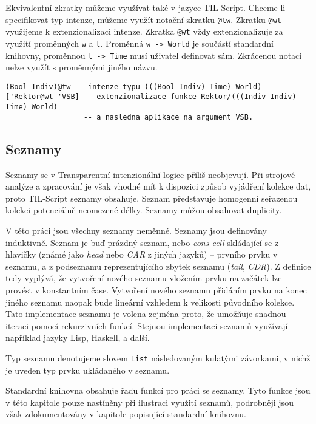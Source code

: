 Ekvivalentní zkratky můžeme využívat také v jazyce TIL-Script. Chceme-li specifikovat typ intenze,
můžeme využít notační zkratku \lstinline{@tw}. Zkratku \lstinline{@wt} využijeme k extenzionalizaci
intenze. Zkratka \lstinline{@wt} vždy extenzionalizuje za využití proměnných \lstinline{w} a
\lstinline{t}. Proměnná \lstinline{w -> World} je součástí standardní knihovny, proměnnou
\lstinline{t -> Time} musí uživatel definovat sám. Zkrácenou notaci nelze využít s proměnnými
jiného názvu.

\begin{lstlisting}[caption={Příklad využití zkrácené notace}]
(Bool Indiv)@tw -- intenze typu (((Bool Indiv) Time) World)
['Rektor@wt 'VSB] -- extenzionalizace funkce Rektor/(((Indiv Indiv) Time) World)
                  -- a nasledna aplikace na argument VSB.
\end{lstlisting}

\subsection{Seznamy}

Seznamy se v Transparentní intenzionální logice příliš neobjevují. Při strojové analýze a
zpracování je však vhodné mít k dispozici způsob vyjádření kolekce dat, proto TIL-Script seznamy
obsahuje. Seznam představuje homogenní seřazenou kolekci potenciálně neomezené délky. Seznamy můžou
obsahovat duplicity.

V této práci jsou všechny seznamy neměnné. Seznamy jsou definovány induktivně. Seznam je buď
prázdný seznam, nebo \textit{cons cell} skládající se z hlavičky (známé jako \textit{head} nebo
\textit{CAR} z jiných jazyků) -- prvního prvku v seznamu, a z podseznamu reprezentujícího
zbytek seznamu (\textit{tail}, \textit{CDR}). Z definice tedy vyplývá, že vytvoření nového seznamu
vložením prvku na začátek lze provést v konstantním čase. Vytvoření nového seznamu přidáním prvku
na konec jiného seznamu naopak bude lineární vzhledem k velikosti původního kolekce. Tato
implementace seznamu je volena zejména proto, že umožňuje snadnou iteraci pomocí rekurzivních funkcí.
Stejnou implementaci seznamů využívají například jazyky Lisp, Haskell, a další.

Typ seznamu denotujeme slovem \lstinline{List} následovaným kulatými závorkami, v nichž je uveden
typ prvku ukládaného v seznamu.

Standardní knihovna obsahuje řadu funkcí pro práci se seznamy. Tyto funkce jsou v této kapitole
pouze nastíněny při ilustraci využití seznamů, podrobněji jsou však zdokumentovány v kapitole
popisující standardní knihovnu.

